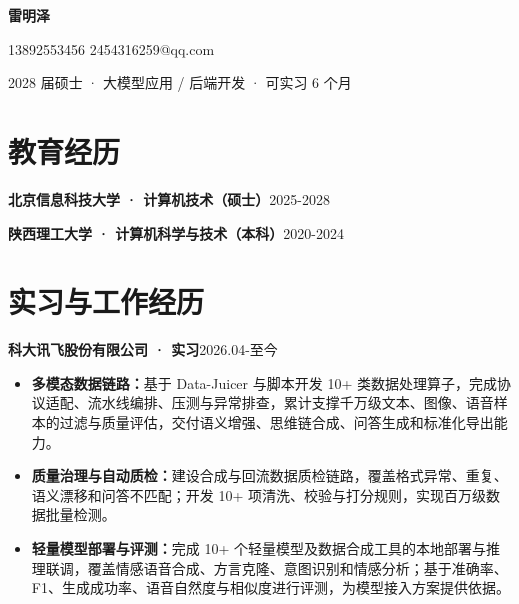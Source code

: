 \documentclass[a4paper,10pt]{ctexart}
\newlength{\asuphotowidth}
\newlength{\asuheadtextwidth}
\newcommand{\asuname}[1]{{\LARGE\bfseries #1}\par\vspace{2pt}}
\newcommand{\asumeta}[1]{{\small #1}\par}
\newcommand{\asuentry}[2]{\textbf{#1}\hfill{\small #2}\par}
\begin{document}
\setlength{\asuphotowidth}{0pt}
\setlength{\asuheadtextwidth}{\dimexpr\linewidth-\asuphotowidth\relax}

\noindent
\begin{minipage}[c]{\asuheadtextwidth}
\asuname{雷明泽}
\asumeta{13892553456 \textbar{} 2454316259@qq.com}
\asumeta{2028 届硕士 · 大模型应用 / 后端开发 · 可实习 6 个月}
\end{minipage}%


\section*{教育经历}
\asuentry{北京信息科技大学 · 计算机技术（硕士）}{2025-2028}
\asuentry{陕西理工大学 · 计算机科学与技术（本科）}{2020-2024}

\section*{实习与工作经历}
\asuentry{科大讯飞股份有限公司 · 实习}{2026.04-至今}
\begin{itemize}
  \item \textbf{多模态数据链路：}基于 Data-Juicer 与脚本开发 10+ 类数据处理算子，完成协议适配、流水线编排、压测与异常排查，累计支撑千万级文本、图像、语音样本的过滤与质量评估，交付语义增强、思维链合成、问答生成和标准化导出能力。
  \item \textbf{质量治理与自动质检：}建设合成与回流数据质检链路，覆盖格式异常、重复、语义漂移和问答不匹配；开发 10+ 项清洗、校验与打分规则，实现百万级数据批量检测。
  \item \textbf{轻量模型部署与评测：}完成 10+ 个轻量模型及数据合成工具的本地部署与推理联调，覆盖情感语音合成、方言克隆、意图识别和情感分析；基于准确率、F1、生成成功率、语音自然度与相似度进行评测，为模型接入方案提供依据。
\end{itemize}
\end{document}
